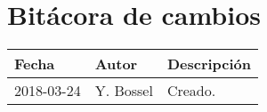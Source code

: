 \section*{Bit\'acora de cambios}
\begin{tabular}{llp{}}
    \toprule
    {\bf Fecha} & {\bf Autor} & {\bf Descripci\'on}\\
    \midrule
    2018-03-24 & Y. Bossel &
    Creado.\\
    \bottomrule
\end{tabular}


